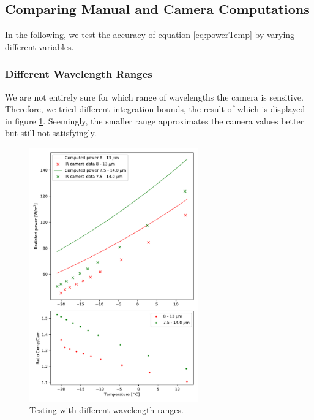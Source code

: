 \subsection{Comparing Manual and Camera Computations}
In the following, we test the accuracy of equation \ref{eq:powerTemp} by varying different variables.
\subsubsection{Different Wavelength Ranges}
We are not entirely sure for which range of wavelengths the camera is sensitive. Therefore, we tried different integration bounds, the result of which is displayed in figure \ref{fig:TempPowerRanges}. Seemingly, the smaller range approximates the camera values better but still not satisfyingly.
\begin{figure}[h!]
	\centering
	\includegraphics[width=0.65\textwidth]{img/T_to_P_Ranges.pdf}
	\caption{Testing with different wavelength ranges.}
	\label{fig:TempPowerRanges}
\end{figure}
